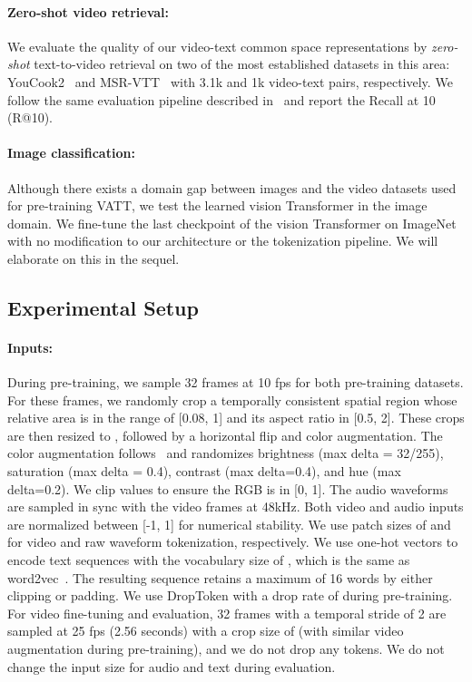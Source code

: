 \documentclass[10pt,twocolumn,letterpaper]{article}
\newcommand{\ours}{VATT\xspace}
\begin{document}
\paragraph{Zero-shot video retrieval:} We evaluate the quality of our video-text common space representations by \textit{zero-shot} text-to-video retrieval on two of the most established datasets in this area: YouCook2~\cite{youcook2} and MSR-VTT~\cite{xu2016msr-vtt} with 3.1k and 1k video-text pairs, respectively. We follow the same evaluation pipeline described in~\cite{mmv} and report the Recall at 10 (R@10).

\paragraph{Image classification:} Although there exists a domain gap between images and the video datasets used for pre-training \ours, we test the learned vision Transformer in the image domain. We fine-tune the last checkpoint of the vision Transformer on ImageNet~\cite{deng2009imagenet} with no modification to our architecture or the tokenization pipeline. We will elaborate on this in the sequel.

\subsection{Experimental Setup}
\label{sec:exp_setup}
\paragraph{Inputs:} During pre-training, we sample 32 frames at 10 fps for both pre-training datasets. For these frames, we randomly crop a temporally consistent spatial region whose relative area is in the range of [0.08, 1] and its aspect ratio in [0.5, 2]. These crops are then resized to , followed by a horizontal flip and color augmentation. The color augmentation follows~\cite{mmv} and randomizes brightness (max delta = 32/255), saturation (max delta = 0.4),
contrast (max delta=0.4), and hue (max delta=0.2). We clip values to ensure the RGB is in [0, 1]. The audio waveforms are sampled in sync with the video frames at 48kHz. Both video and audio inputs are normalized between [-1, 1] for numerical stability. We use patch sizes of  and  for video and raw waveform tokenization, respectively. We use one-hot vectors to encode text sequences with the vocabulary size of , which is the same as word2vec~\cite{mikolov2013efficient}. The resulting sequence retains a maximum of 16 words by either clipping or padding. We use DropToken with a drop rate of  during pre-training. For video fine-tuning and evaluation, 32 frames with a temporal stride of 2 are sampled at 25 fps (2.56 seconds) with a crop size of  (with similar video augmentation during pre-training), and we do not drop any tokens. We do not change the input size for audio and text during evaluation.
\end{document}
